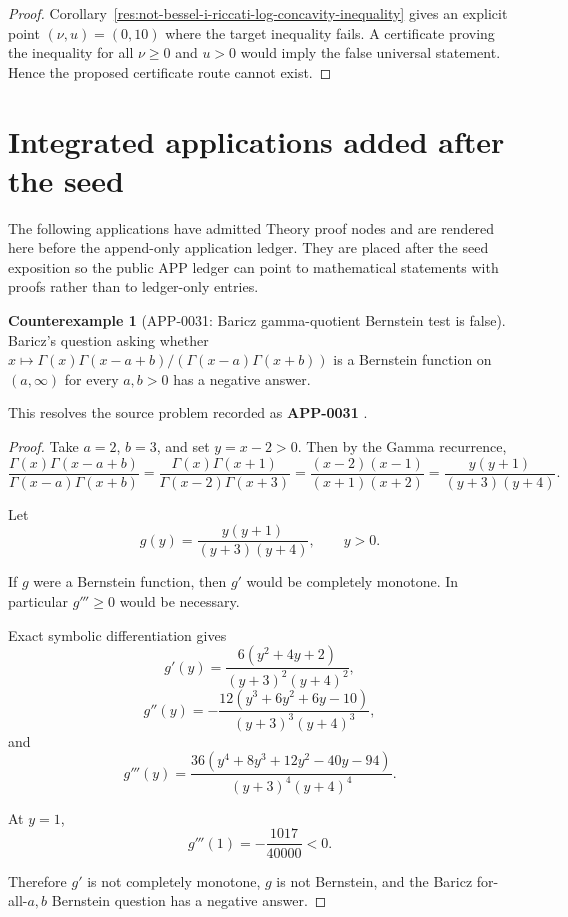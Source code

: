 \documentclass[11pt]{article}
\numberwithin{equation}{section}
\theoremstyle{definition}
\newtheorem{counterexample}[theorem]{Counterexample}
\theoremstyle{remark}
\newcommand{\1}{\mathbf 1}
\begin{document}
\begin{proof}
Corollary~\ref{res:not-bessel-i-riccati-log-concavity-inequality} gives an explicit point \((\nu,u)=(0,10)\) where the target inequality fails.  A certificate proving the inequality for all \(\nu\ge0\) and \(u>0\) would imply the false universal statement.  Hence the proposed certificate route cannot exist.
\end{proof}

\section{Integrated applications added after the seed}
\label{sec:post-seed-integrated-applications}
The following applications have admitted Theory proof nodes and are rendered here before the append-only application ledger.  They are placed after the seed exposition so the public APP ledger can point to mathematical statements with proofs rather than to ledger-only entries.

\begin{counterexample}[APP-0031: Baricz gamma-quotient Bernstein test is false]
\label{res:baricz-gamma-quotient-bf-forall-negative-answer}
Baricz's question asking whether \(x\mapsto\Gamma(x)\Gamma(x-a+b)/(\Gamma(x-a)\Gamma(x+b))\) is a Bernstein function on \((a,\infty)\) for every \(a,b>0\) has a negative answer.

This resolves the source problem recorded as \textbf{APP-0031} \cite{baricz-turan}.
\end{counterexample}

\begin{proof}
Take \(a=2\), \(b=3\), and set \(y=x-2>0\). Then by the Gamma recurrence,
\[
\frac{\Gamma(x)\Gamma(x-a+b)}{\Gamma(x-a)\Gamma(x+b)}
=\frac{\Gamma(x)\Gamma(x+1)}{\Gamma(x-2)\Gamma(x+3)}
=\frac{(x-2)(x-1)}{(x+1)(x+2)}
=\frac{y(y+1)}{(y+3)(y+4)}.
\]

Let
\[
g(y)=\frac{y(y+1)}{(y+3)(y+4)},\qquad y>0.
\]

If \(g\) were a Bernstein function, then \(g'\) would be completely monotone. In particular \(g'''\ge0\) would be necessary.

Exact symbolic differentiation gives
\[
g'(y)=\frac{6(y^2+4y+2)}{(y+3)^2(y+4)^2},
\]
\[
g''(y)=
-\frac{12(y^3+6y^2+6y-10)}{(y+3)^3(y+4)^3},
\]
and
\[
g'''(y)=
\frac{36(y^4+8y^3+12y^2-40y-94)}{(y+3)^4(y+4)^4}.
\]

At \(y=1\),
\[
g'''(1)=-\frac{1017}{40000}<0.
\]

Therefore \(g'\) is not completely monotone, \(g\) is not Bernstein, and the Baricz for-all-\(a,b\) Bernstein question has a negative answer.
\end{proof}
\end{document}
